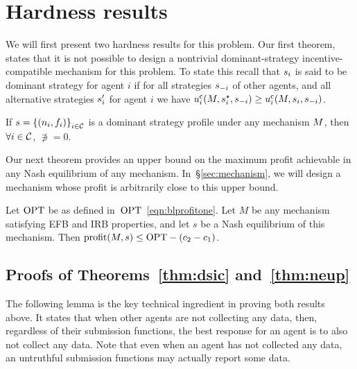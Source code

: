 \section{Hardness results}
\label{sec:hardness}


We will first present two hardness results 
for this problem.
Our first theorem, states that it is not possible to design a nontrivial dominant-strategy incentive-compatible mechanism for this problem.
To state this recall that $s_i$ is said
to be dominant strategy for agent $i$ if
for all strategies $s_{-i}$ of other agents, and all alternative strategies $s_i'$ for agent $i$
we have $u^{\rm c}_{i}(M, s_i^{\star}, s_{-i}) \geq  u^{\rm c}_{i}(M, s_i, s_{-i})$. 



\begin{theorem}
    \label{thm:dsic}
    If $s=\left\{(n_i, f_i)\right\}_{i\in\mathcal{C}}$ is a dominant strategy profile under any mechanism $M$, then $\forall i\in\mathcal{C}$, $\nni=0$.
\end{theorem}


Our next theorem provides an upper bound on the maximum profit achievable in any Nash equilibrium of any mechanism.
In~\S\ref{sec:mechanism}, we will design a mechanism whose profit is arbitrarily close to this upper bound.

\begin{theorem}
    \label{thm:neup}
    Let ${\rm OPT}$ be as defined in~${\rm OPT}$~\eqref{eqn:blprofitone}.
    Let $M$ be any mechanism satisfying EFB and IRB properties, and let $s$ be a Nash equilibrium of this mechanism.
    Then ${\rm profit}(M, s) \leq {\rm OPT} - (c_2 - c_1)$.
\end{theorem}


\subsection{Proofs of Theorems~\ref{thm:dsic} and~\ref{thm:neup}}
\label{sec:hardnessproofs}

The following lemma is the key technical ingredient in proving both results above.
It states that when other agents are not collecting any data, then, regardless of their submission functions, the best response for an agent is to also not collect any data.
Note that even when an agent has not collected any data, an untruthful submission functions may actually report some data.


